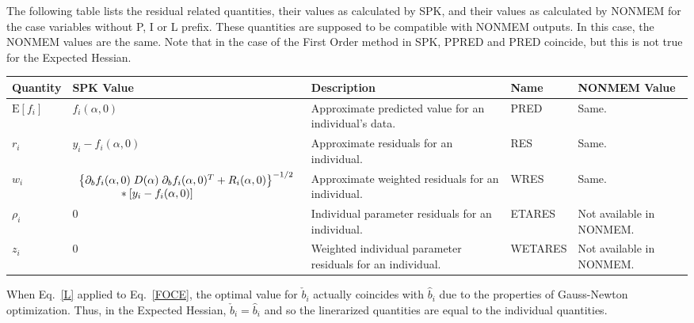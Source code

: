 \documentclass{article}
\begin{document}
The following table lists the residual related quantities, their
values as calculated by SPK, and their values as calculated by NONMEM for the 
case variables without P, I or L prefix. These quantities are supposed to be
compatible with NONMEM outputs. In this case, the NONMEM values are the same.
Note that in the case of the First Order method in SPK, PPRED and PRED coincide,
but this is not true for the Expected Hessian.

\begin{center}
\begin{tabular}{|p{0.75in}|p{3.25in}|p{1.1in}|p{0.85in}|p{1.0in}|}
\hline
\hline
  {\bf Quantity}
    & {\bf SPK Value}
    & {\bf Description}
    & {\bf Name}
    & {\bf NONMEM Value} \\
  \hline
  \hline
  $\mbox{E} \left[ f_i \right]$
    & $f_i(\alpha, 0)$
    & Approximate predicted value for an individual's data.
    & PRED 
    & Same.\\
  \hline
  $r_i$
    & $y_i - f_i(\alpha, 0) $
    & Approximate residuals for an individual.
    & RES 
    & Same.\\
  \hline
  $w_i$
    & $\begin{array}{l}
        \left\{ \partial_b f_i(\alpha, 0) \;
          D(\alpha) \; \partial_b f_i(\alpha, 0)^T
          + R_i(\alpha, 0) \right\}^{-1/2} \\
        \mbox{\hspace{0.5in}}
        \ast [ y_i - f_i(\alpha, 0) ]
      \end{array} $
    & Approximate weighted residuals for an individual.
    & WRES 
    & Same.\\
  \hline
  $\rho_i$
    & 0
    & Individual parameter residuals for an individual.
    & ETARES
    & Not available in NONMEM. \\
  \hline
  $z_i$
    & 0
    & Weighted individual parameter residuals for an individual.
    & WETARES
    & Not available in NONMEM. \\
  \hline
  \hline
\end{tabular}
\end{center}

\newpage

When Eq.~\ref{L} applied to Eq.~\ref{FOCE}, the optimal value for $\check{b}_i$
actually coincides with $\hat{b}_i$ due to the properties of Gauss-Newton
optimization. Thus, in the Expected Hessian, $\check{b}_i
=\hat{b}_i$ and so the linerarized quantities are equal to the individual quantities.
\end{document}
